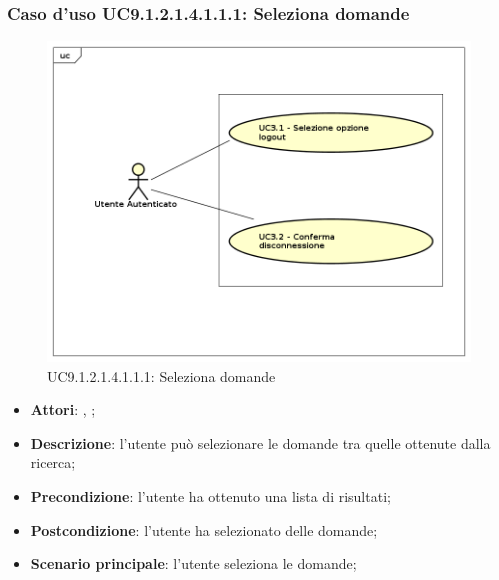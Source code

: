 								\subsubsection{Caso d'uso UC9.1.2.1.4.1.1.1: Seleziona domande}
								\label{UC9.1.2.1.4.1.1.1}
								\begin{figure}[h]
									\centering
									\includegraphics[scale=0.5,keepaspectratio]{UML/UC9.png}
									\caption{UC9.1.2.1.4.1.1.1: Seleziona domande}
								\end{figure}
								\FloatBarrier
								\begin{itemize}
									\item \textbf{Attori}: \uau, \uaupro;
									\item \textbf{Descrizione}: l'utente può selezionare le domande tra quelle ottenute dalla ricerca;
									\item \textbf{Precondizione}: l'utente ha ottenuto una lista di risultati;
									\item \textbf{Postcondizione}: l'utente ha selezionato delle domande; 
									\item \textbf{Scenario principale}: l'utente seleziona le domande;
								\end{itemize}
							
